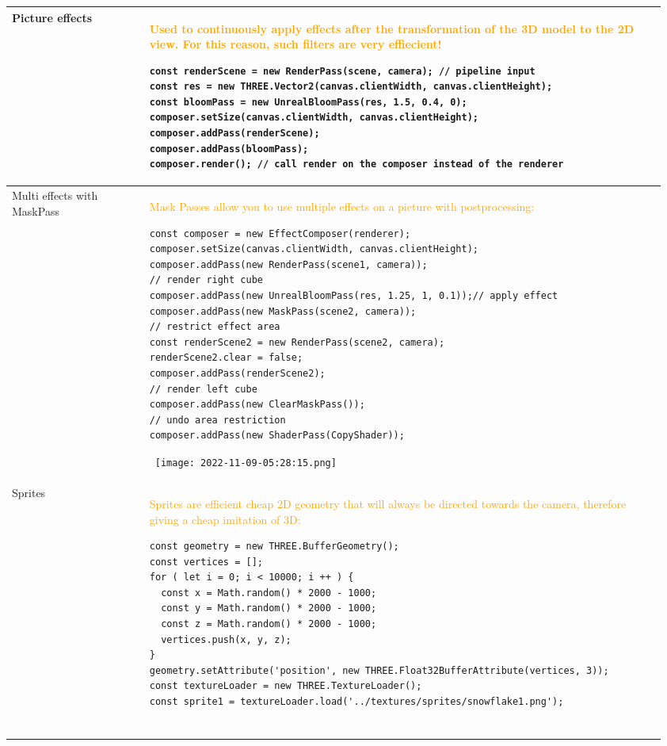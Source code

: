 \documentclass[main.tex,fontsize=8pt,paper=a4,paper=portrait,DIV=calc,]{scrartcl}
\begin{document}
\begin{table}[ht!]
\begin{tabular}{|m{0.2\linewidth}|m{0.755\linewidth}|}
\hline
Picture effects & 
\textcolor{orange}{Used to continuously apply effects after the transformation of the 3D model to the 2D view.\newline
For this reason, such filters are very effiecient!}\newline
\begin{lstlisting}
const renderScene = new RenderPass(scene, camera); // pipeline input
const res = new THREE.Vector2(canvas.clientWidth, canvas.clientHeight);
const bloomPass = new UnrealBloomPass(res, 1.5, 0.4, 0);
composer.setSize(canvas.clientWidth, canvas.clientHeight);
composer.addPass(renderScene);
composer.addPass(bloomPass);
composer.render(); // call render on the composer instead of the renderer
\end{lstlisting}\\
\hline
Multi effects with MaskPass & 
\textcolor{orange}{Mask Passes allow you to use multiple effects on a picture with postprocessing:}\newline
\begin{lstlisting}
const composer = new EffectComposer(renderer);
composer.setSize(canvas.clientWidth, canvas.clientHeight);
composer.addPass(new RenderPass(scene1, camera));
// render right cube
composer.addPass(new UnrealBloomPass(res, 1.25, 1, 0.1));// apply effect
composer.addPass(new MaskPass(scene2, camera));
// restrict effect area
const renderScene2 = new RenderPass(scene2, camera);
renderScene2.clear = false;
composer.addPass(renderScene2);
// render left cube
composer.addPass(new ClearMaskPass());
// undo area restriction
composer.addPass(new ShaderPass(CopyShader));
\end{lstlisting}
\, \newline
\texttt{[image: 2022-11-09-05:28:15.png]}\\
\hline
Sprites & 
\textcolor{orange}{Sprites are efficient cheap 2D geometry that will always be directed towards the camera, therefore giving a cheap imitation of 3D:}\newline
\begin{lstlisting}
const geometry = new THREE.BufferGeometry();
const vertices = [];
for ( let i = 0; i < 10000; i ++ ) {
  const x = Math.random() * 2000 - 1000;
  const y = Math.random() * 2000 - 1000;
  const z = Math.random() * 2000 - 1000;
  vertices.push(x, y, z);
}
geometry.setAttribute('position', new THREE.Float32BufferAttribute(vertices, 3));
const textureLoader = new THREE.TextureLoader();
const sprite1 = textureLoader.load('../textures/sprites/snowflake1.png');


\end{lstlisting}
\end{tabular}
\end{table}
\end{document}
